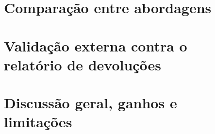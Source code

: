

\section{Comparação entre abordagens}
\label{sec:comparacao}



\section{Validação externa contra o relatório de devoluções}
\label{sec:validacao_devolucoes}



\section{Discussão geral, ganhos e limitações}
\label{sec:discussao}

